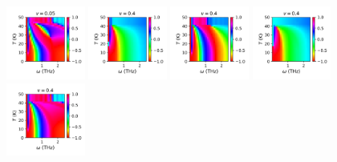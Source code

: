 \documentclass[a4paper]{article}
\begin{document}
\begin{figure}[H]
  \includegraphics[width=0.23\textwidth]{v2-g4_phase.png}
  \includegraphics[width=0.23\textwidth]{v3-g1_phase.png}
  \includegraphics[width=0.23\textwidth]{v3-g2_phase.png}
  \includegraphics[width=0.23\textwidth]{v3-g3_phase.png}
  \includegraphics[width=0.23\textwidth]{v3-g4_phase.png}
\end{figure}
\end{document}

